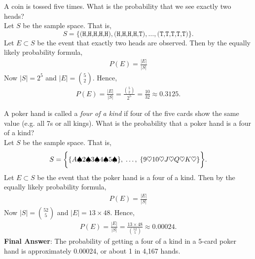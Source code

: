 \documentclass[10pt]{beamer}
\begin{document}
\begin{frame}
\begin{mygreenbox}[title=\text{Example: Coin tossing}]
A coin is tossed five times.  What is the probability that we see exactly two heads?  \\

\pause 
Let $S$ be the sample space.  That is,
 \[ S=\bigg\{\texttt{(H,H,H,H,H)}, \texttt{(H,H,H,H,T)}, \hdots, \texttt{(T,T,T,T,T)} \bigg\}. \]
Let $E \subset S$ be the event that exactly two heads are observed. Then by the equally likely probability formula, 
\begin{align*}
P(E) = 	\frac{|E|}{|S|} 
\end{align*}
\pause 
Now $|S|=2^{5}$ and $|E|=\binom{5}{2}$. 
\pause
Hence,
%
\begin{align*}
P(E) = 	\frac{|E|}{|S|} = \frac{\binom{5}{2}}{2^{5}} = \frac{10}{32} \approx 0.3125.
\end{align*}
\end{mygreenbox}

\end{frame}

\begin{frame}
\small 
\begin{mygreenbox}[title=\text{Example: Four of a kind}]
A poker hand is called a \textit{four of a kind} if four of the five cards show the same value (e.g. all 7s or all kings).  What is the probability that a poker hand is a four of a kind?  \\

\pause 
Let $S$ be the sample space.  That is, 
\[S=\bigg\{ \{ {A\spadesuit 2 \spadesuit 3 \spadesuit 4 \spadesuit 5 \spadesuit} \}, \;   \hdots, \; \{ {9 \heartsuit 10 \heartsuit J \heartsuit Q \heartsuit K \heartsuit} \} \bigg\}. \]
Let $E \subset S$ be the event that the poker hand is a four of a kind. Then by the equally likely probability formula, 
\begin{align*}
P(E) = 	\frac{|E|}{|S|} 
\end{align*}
\pause 
Now $|S|=\binom{52}{5}$ and $|E|=13 \times 48$. 
\pause
Hence,
%
\begin{align*}
P(E) = 	\frac{|E|}{|S|} = \frac{13 \times 48}{\binom{52}{5}} \approx 0.00024.
\end{align*}
\vfill 
\textbf{Final Answer}: The probability of getting a four of a kind in a 5-card poker hand is approximately 0.00024, or about 1 in 4,167 hands.
\end{mygreenbox}

\end{frame}
\end{document}
